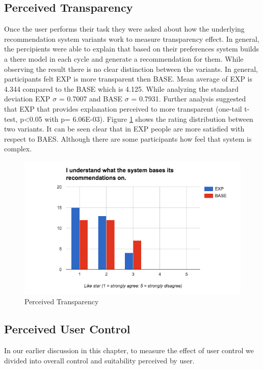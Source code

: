 \subsection{Perceived Transparency}
Once the user performs their task they were asked about how the underlying recommendation system variants work to measure transparency effect. In general, the percipients were able to explain that based on their preferences system builds a there model in each cycle and generate a recommendation for them.  While observing the result there is no clear distinction between the variants. In general, participants felt EXP is more transparent then BASE.  Mean average of EXP is 4.344 compared to the BASE which is 4.125. While analyzing the standard deviation EXP ${\sigma}$ = 0.7007 and BASE ${\sigma}$ = 0.7931. Further analysis suggested that EXP that provides explanation perceived to more transparent (one-tail t-test, p<0.05 with p= 6.06E-03). Figure \ref{fig:ch5_stat_transpancy} shows the rating distribution between two variants. It can be seen clear that in EXP people are more satisfied with respect to BAES. Although there are some participants how feel that system is complex.
\begin{figure}[h]
	\centering
	\includegraphics[width=1\linewidth]{figures/ch5_stat_transpancy.png}
	\caption{Perceived Transparency}
	\label{fig:ch5_stat_transpancy}
\end{figure}
\subsection{Perceived User Control}
In our earlier discussion in this chapter, to measure the effect of user control we divided into overall control and suitability perceived by user. 
